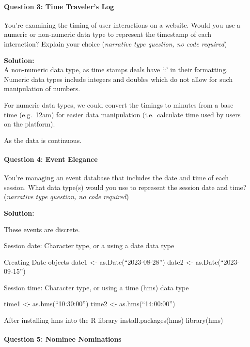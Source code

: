 \documentclass[
]{article}
\begin{document}
\hypertarget{question-3-time-travelers-log}{%
\paragraph{Question 3: Time Traveler's
Log}\label{question-3-time-travelers-log}}

You're examining the timing of user interactions on a website. Would you
use a numeric or non-numeric data type to represent the timestamp of
each interaction? Explain your choice (\emph{narrative type question, no
code required})

\textbf{Solution:}\\
A non-numeric data type, as time stamps deals have `:' in their
formatting. Numeric data types include integers and doubles which do not
allow for such manipulation of numbers.

For numeric data types, we could convert the timings to minutes from a
base time (e.g.~12am) for easier data manipulation (i.e.~calculate time
used by users on the platform).

As the data is continuous.

\hypertarget{question-4-event-elegance}{%
\paragraph{Question 4: Event Elegance}\label{question-4-event-elegance}}

You're managing an event database that includes the date and time of
each session. What data type(s) would you use to represent the session
date and time? (\emph{narrative type question, no code required})

\textbf{Solution:}

These events are discrete.

Session date: Character type, or a using a date data type

Creating Date objects date1 \textless- as.Date(``2023-08-28'') date2
\textless- as.Date(``2023-09-15'')

Session time: Character type, or using a time (hms) data type

time1 \textless- as.hms(``10:30:00'') time2 \textless-
as.hms(``14:00:00'')

After installing hms into the R library install.packages(hms)
library(hms)

\hypertarget{question-5-nominee-nominations}{%
\paragraph{Question 5: Nominee
Nominations}\label{question-5-nominee-nominations}}
\end{document}
